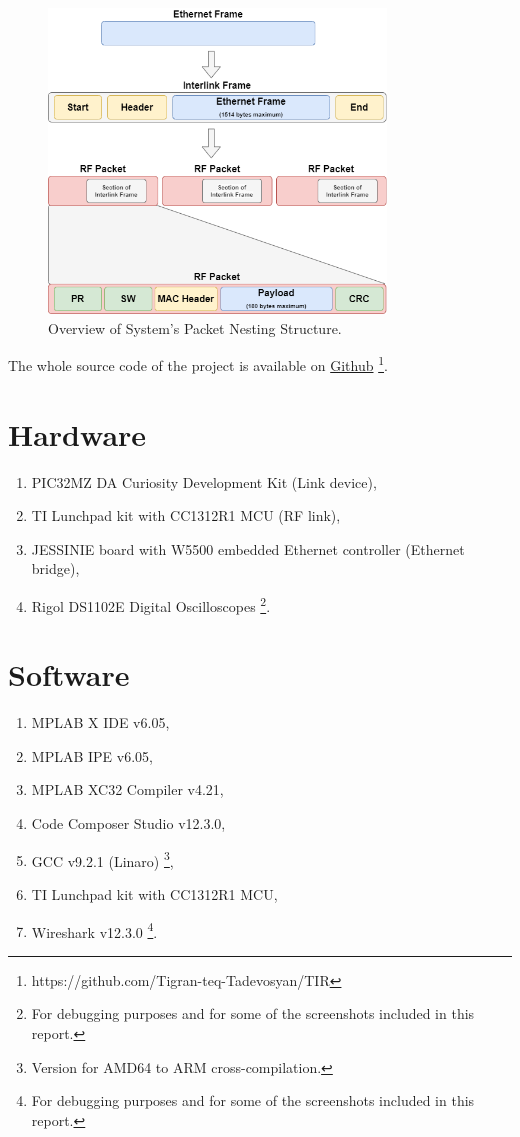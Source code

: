 \begin{figure}[H]
\begin{center}
\includegraphics[width=0.8\textwidth]{packet-nesting.png}
\end{center}
\caption{Overview of System's Packet Nesting Structure.}
\label{packet-nesting}
\end{figure}

The whole source code of the project is available on \href{https://github.com/Tigran-teq-Tadevosyan/TIR}{Github} \footnote{https://github.com/Tigran-teq-Tadevosyan/TIR}.


\section{Hardware}
\begin{enumerate}[nolistsep]
\item PIC32MZ DA Curiosity Development Kit (Link device),
\item TI Lunchpad kit with CC1312R1 MCU	(RF link),			
\item JESSINIE board with W5500 embedded Ethernet controller (Ethernet bridge),
\item Rigol DS1102E Digital Oscilloscopes \footnote[1]{For debugging purposes and for some of the screenshots included in this report.}.
\end{enumerate}

\section{Software}
\begin{enumerate}[nolistsep]
\item MPLAB X IDE v6.05,
\item MPLAB IPE v6.05,
\item MPLAB XC32 Compiler v4.21,
\item Code Composer Studio v12.3.0,
\item GCC v9.2.1 (Linaro) \footnote[2]{Version for AMD64 to ARM cross-compilation.},
\item TI Lunchpad kit with CC1312R1 MCU,
\item Wireshark v12.3.0 \footnote[3]{For debugging purposes and for some of the screenshots included in this report.}.
\end{enumerate}